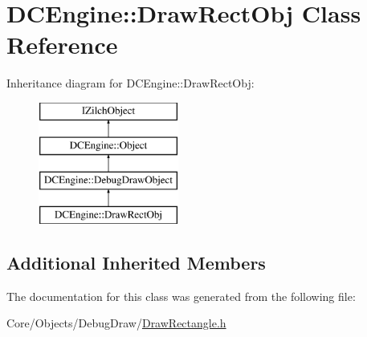 \hypertarget{classDCEngine_1_1DrawRectObj}{\section{D\-C\-Engine\-:\-:Draw\-Rect\-Obj Class Reference}
\label{classDCEngine_1_1DrawRectObj}
}
Inheritance diagram for D\-C\-Engine\-:\-:Draw\-Rect\-Obj\-:\begin{figure}[H]
\begin{center}
\leavevmode
\includegraphics[height=4.000000cm]{classDCEngine_1_1DrawRectObj}
\end{center}
\end{figure}
\subsection*{Additional Inherited Members}


The documentation for this class was generated from the following file\-:\begin{DoxyCompactItemize}
\item 
Core/\-Objects/\-Debug\-Draw/\hyperlink{DrawRectangle_8h}{Draw\-Rectangle.\-h}\end{DoxyCompactItemize}
